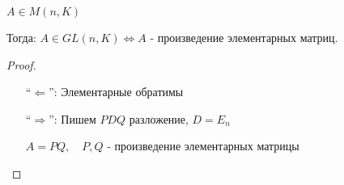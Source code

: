 \follow \; $A \in M(n, K)$

Тогда: $A \in GL(n, K) \Longleftrightarrow A$ - произведение элементарных матриц.

\begin{proof} \quad

    \begin{itemize}
        \item[``$\Longleftarrow$'':] Элементарные обратимы
        \item[``$\Longrightarrow$'':] Пишем $PDQ$ разложение, $D = E_n$
        
        $A = PQ, \quad P, Q$ - произведение элементарных матрицы
    \end{itemize}
\end{proof}
